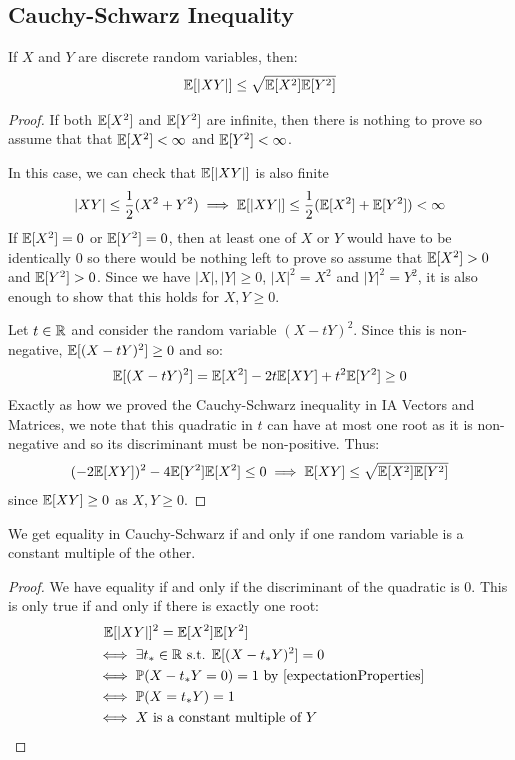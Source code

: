 \documentclass[../main.tex]{subfiles}
\begin{document}
\subsection{Cauchy-Schwarz Inequality}
\begin{proposition}
  If $X$ and $Y$ are discrete random variables, then: \label{CSInequality}
  \[
    \mathbb{E}[|XY|] \leq \sqrt{\mathbb{E}[X^2]\mathbb{E}[Y^2]}
  \]
\end{proposition}
\begin{proof}
  If both $\mathbb{E}[X^2]$ and $\mathbb{E}[Y^2]$ are infinite, then there is nothing to prove so assume that that $\mathbb{E}[X^2] < \infty$ and $\mathbb{E}[Y^2] < \infty$.

  In this case, we can check that $\mathbb{E}[|XY|]$ is also finite
  \[
    |XY| \leq \frac{1}{2}(X^2 + Y^2) \implies \mathbb{E}[|XY|] \leq \frac{1}{2}(\mathbb{E}[X^2] + \mathbb{E}[Y^2]) < \infty
  \]
  If $\mathbb{E}[X^2] = 0$ or $\mathbb{E}[Y^2] = 0$, then at least one of $X$ or $Y$ would have to be identically 0 so there would be nothing left to prove so assume that $\mathbb{E}[X^2] > 0$ and $\mathbb{E}[Y^2] > 0$.
  Since we have $|X|, |Y| \geq 0$, $|X|^2 = X^2$ and $|Y|^2 = Y^2$, it is also enough to show that this holds for $X, Y \geq 0$.

  Let $t \in \mathbb{R}$ and consider the random variable $(X - tY)^2$.
  Since this is non-negative, $\mathbb{E}[(X - tY)^2] \geq 0$ and so:
  \[
    \mathbb{E}[(X - tY)^2] = \mathbb{E}[X^2] - 2t\mathbb{E}[XY] + t^2 \mathbb{E}[Y^2] \geq 0
  \]
  Exactly as how we proved the Cauchy-Schwarz inequality in IA Vectors and Matrices, we note that this quadratic in $t$ can have at most one root as it is non-negative and so its discriminant must be non-positive.
  Thus:
  \begin{align*}
    (-2\mathbb{E}[XY])^2 - 4\mathbb{E}[Y^2]\mathbb{E}[X^2] \leq 0 \implies \mathbb{E}[XY] \leq \sqrt{\mathbb{E}[X^2]\mathbb{E}[Y^2]}
  \end{align*}
  since $\mathbb{E}[XY] \geq 0$ as $X, Y \geq 0$.
\end{proof}
\begin{lemma}
  We get equality in Cauchy-Schwarz if and only if one random variable is a constant multiple of the other.
\end{lemma}
\begin{proof}
  We have equality if and only if the discriminant of the quadratic is 0.
  This is only true if and only if there is exactly one root:
  \begin{align*}
    &\ \ \E[|XY|]^2 = \E[X^2]\E[Y^2] \\
    &\iff \exists t_* \in \R \text{ s.t. } \E[(X - t_{*}Y)^2] = 0 \\
    &\iff \P(X - t_*Y = 0) = 1 \text{ by \cref{expectationProperties}} \\
    &\iff \P(X = t_* Y) = 1 \\
    &\iff \text{$X$ is a constant multiple of $Y$}
  \end{align*}
\end{proof}
\end{document}
